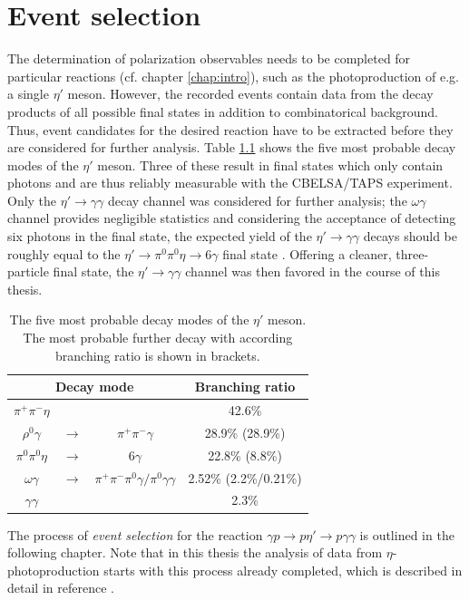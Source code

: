 \chapter{Event selection}
The determination of polarization observables needs to be completed for particular reactions (cf. chapter \ref{chap:intro}), such as the photoproduction of e.g. a single $\eta'$ meson. However, the recorded events  contain data from the decay products of all possible final states in addition to combinatorical background. Thus, event candidates for the desired reaction have to be extracted before they are considered for further analysis. Table \ref{tab:etap} shows the five most probable decay modes of the $\eta'$ meson. Three of these result in final states which only contain photons and are thus reliably measurable with the CBELSA/TAPS experiment. Only the $\eta'\to\gamma\gamma$ decay channel was considered for further analysis; the $\omega\gamma$ channel provides negligible statistics and considering the acceptance of detecting six photons in the final state, the expected yield of the $\eta'\to\gamma\gamma$ decays should be roughly equal to the $\eta'\to\pi^0\pi^0\eta\to6\gamma$ final state \cite{farah}. Offering a cleaner, three-particle final state, the $\eta'\to\gamma\gamma$ channel was then favored in the course of this thesis.    
\begin{table}[htbp]
	\centering
	\begin{tabular}{cccc}
		\toprule
		\multicolumn{3}{c}{Decay mode}&Branching ratio\\
		\hline
		$\pi^+\pi^-\eta$&&&42.6\%\\
		$\rho^0\gamma$&$\to$&$\pi^+\pi^-\gamma$ &28.9\% (28.9\%)\\
	$\pi^0\pi^0\eta$&$\to$&$6\gamma$ & 22.8\% (8.8\%)\\
		$\omega\gamma$ &$\to$&$ \pi^+\pi^-\pi^0\gamma/\pi^0\gamma\gamma$&2.52\% (2.2\%/0.21\%)\\
	$\gamma\gamma$&&&2.3\%\\

		\bottomrule
	\end{tabular}
\caption{The five most probable decay modes of the $\eta'$ meson. The most probable further decay with according branching ratio is shown in brackets.\cite{pdg}}
\label{tab:etap}
\end{table}

\noindent The process of \emph{event selection} for the reaction $\gamma p \to p\eta'\to p\gamma\gamma$ is outlined in the following chapter. Note that in this thesis the analysis of data from $\eta$-photoproduction starts with this process already completed, which is described in detail in reference \cite{farahphd}.

